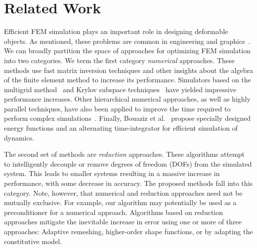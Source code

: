 \section{Related Work}
Efficient FEM simulation plays an important role in designing deformable objects.
As mentioned, these problems are common in engineering and
graphics~\cite{bendsoe2004topology,Bickel2010,Kou2012,Skouras2013,Chen2013,Xu2014}.
We can broadly partition the space of approaches for optimizing FEM simulation into two categories.
We term the first category \emph{numerical} approaches.
These methods use fast matrix inversion techniques and other insights about the algebra of the finite element method to increase its performance.
Simulators based on the multigrid method~\cite{Peraire1992,Zhu2010,McAdams2011} and Krylov subspace techniques~\cite{Patterson2012} have yielded impressive performance increases.
Other hierarchical numerical approaches, as well as highly parallel techniques, have also been applied to improve the time required to perform complex simulations~\cite{Farhat1991,Mandel1993}.
Finally, Bouaziz et al.~\cite{Bouaziz:2014} propose specially designed energy functions and an alternating time-integrator for efficient simulation of dynamics.

The second set of methods are \emph{reduction} approaches.
These algorithms attempt to intelligently decouple or remove degrees of freedom (DOFs) from the simulated system.
This leads to smaller systems resulting in a massive increase in performance, with some decrease in accuracy.
The proposed methods fall into this category.
Note, however, that numerical and reduction approaches need not be mutually exclusive.
For example, our algorithm may potentially be used as a preconditioner for a numerical approach. Algorithms based on reduction approaches mitigate the inevitable increase in error using one or more of three approaches: Adaptive remeshing, higher-order shape functions, or by adapting the constitutive model.

